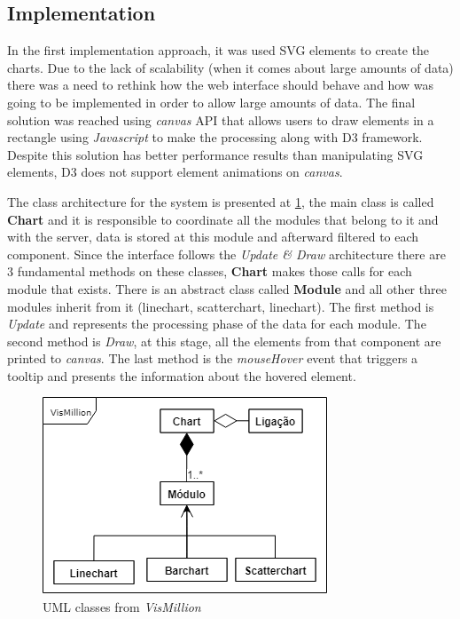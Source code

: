 \documentclass[letterpaper, 10 pt, conference]{ieeeconf}  %
\begin{document}
\subsection{Implementation}
\label{subsection:implementation}
In the first implementation approach, it was used SVG elements to create the charts. Due to the lack of scalability (when it comes about large amounts of data) there was a need to rethink how the web interface should behave and how was going to be implemented in order to allow large amounts of data. The final solution was reached using \textit{canvas} API that allows users to draw elements in a rectangle using \textit{Javascript} to make the processing along with D3 framework. Despite this solution has better performance results than manipulating SVG elements, D3 does not support element animations on \textit{canvas}.


The class architecture for the system is presented at \ref{fig:uml}, the main class is called \textbf{Chart} and it is responsible to coordinate all the modules that belong to it and with the server, data is stored at this module and afterward filtered to each component. Since the interface follows the \textit{Update \& Draw} architecture there are 3 fundamental methods on these classes, \textbf{Chart} makes those calls for each module that exists. There is an abstract class called \textbf{Module} and all other three modules inherit from it (linechart, scatterchart, linechart). The first method is \textit{Update} and represents the processing phase of the data for each module. The second method is \textit{Draw}, at this stage, all the elements from that component are printed to \textit{canvas}. The last method is the \textit{mouseHover} event that triggers a tooltip and presents the information about the hovered element. 

\begin{figure}[h]
    \centering
    \includegraphics[width=0.8\linewidth]{Figures/uml.png}
    \caption{UML classes from \textit{VisMillion}}
        \label{fig:uml}
\end{figure}
\end{document}
